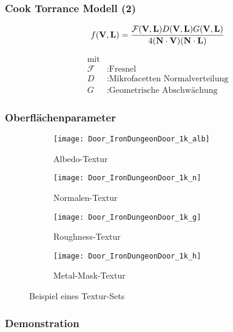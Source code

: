 \begin{frame}
  \frametitle{Cook Torrance Modell (2)}
  \begin{Definition}

    \begin{align*}
    	f(\mathbf V,\mathbf L) = \frac{\mathcal{F}(\mathbf V,\mathbf L)D(\mathbf V,\mathbf L)G(\mathbf V,\mathbf L)}{4(\mathbf N \cdot \mathbf V)(\mathbf N \cdot \mathbf L)}
    \end{align*}

    \begin{align*}
      \text{mit}\\
      \mathcal{F} &: \text{Fresnel} \\
    	D  &: \text{Mikrofacetten Normalverteilung} \\
    	G  &: \text{Geometrische Abschwächung}
    \end{align*}

  \end{Definition}
\end{frame}

\begin{frame}
  \frametitle{Oberflächenparameter}

  \begin{figure}
    \centering
    \begin{subfigure}{0.24\textwidth}
    	\texttt{[image: Door\_IronDungeonDoor\_1k\_alb]}
    	\caption{Albedo-Textur}
    \end{subfigure}
    \begin{subfigure}{0.24\textwidth}
    	\texttt{[image: Door\_IronDungeonDoor\_1k\_n]}
    	\caption{Normalen-Textur}
    \end{subfigure}
    \begin{subfigure}{0.24\textwidth}
    	\texttt{[image: Door\_IronDungeonDoor\_1k\_g]}
    	\caption{Roughness-Textur}
    \end{subfigure}
    \begin{subfigure}{0.24\textwidth}
    	\texttt{[image: Door\_IronDungeonDoor\_1k\_h]}
    	\caption{Metal-Mask-Textur}
    \end{subfigure}
    \caption{Beispiel eines Textur-Sets}
  \end{figure}

\end{frame}

\begin{frame}
  \frametitle{Demonstration}
\end{frame}



